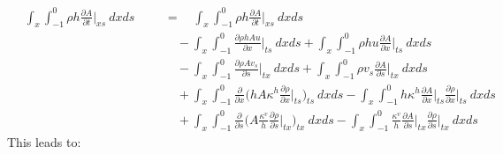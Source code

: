 \begin{subequations}
  \begin{alignat}{2}
\quad  \int_x \int_{-1}^0 \rho h \frac{\partial A}{\partial t}\bigg\rvert_{xs} \ dx ds
& &&= \quad  \int_x \int_{-1}^0 \rho h \frac{\partial A}{\partial t}\bigg\rvert_{xs} \ dx ds\\
 & && \quad - \int_x \int_{-1}^0 \frac{\partial \rho h A u}{\partial x}\bigg\rvert_{ts} \ dx ds
 + \int_x \int_{-1}^0\rho h u \frac{\partial A}{\partial x}\bigg\rvert_{ts} \ dx ds\\ 
 & && \quad - \int_x \int_{-1}^0 \frac{\partial \rho A v_s}{\partial s}\bigg\rvert_{tx} \ dx ds
 + \int_x \int_{-1}^0 \rho v_s \frac{\partial A}{\partial s}\bigg\rvert_{tx} \ dx ds \\
 & && \quad + \int_x \int_{-1}^0 \frac{\partial}{\partial x} \bigg(h A \kappa^h \frac{\partial \rho}{\partial x}\bigg\rvert_{ts}\bigg)_{ts} \ dx ds 
 - \int_x \int_{-1}^0 h \kappa^h \frac{\partial A}{\partial x}\bigg\rvert_{ts} \frac{\partial \rho}{\partial x}\bigg\rvert_{ts} \ dx ds \\
 & && \quad + \int_x \int_{-1}^0 \frac{\partial}{\partial s} \bigg( A \frac{\kappa^v}{h} \frac{\partial \rho}{\partial s}\bigg\rvert_{tx}\bigg)_{tx} \ dx ds 
 - \int_x \int_{-1}^0 \frac{\kappa^v}{h} \frac{\partial A}{\partial s}\bigg\rvert_{tx} \frac{\partial \rho}{\partial s}\bigg\rvert_{tx} \ dx ds 
  \end{alignat}
\end{subequations}
This leads to:
